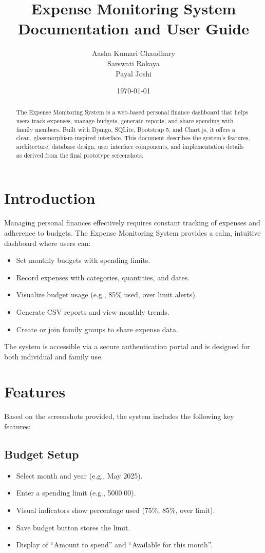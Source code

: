 \documentclass[12pt,a4paper]{article}
\title{\textbf{Expense Monitoring System} \\ \Large Documentation and User Guide}
\author{Aasha Kumari Chaudhary \\ Sarswati Rokaya \\ Payal Joshi}
\date{\today}
\begin{document}
\maketitle

\begin{abstract}
The Expense Monitoring System is a web-based personal finance dashboard that helps users track expenses, manage budgets, generate reports, and share spending with family members. Built with Django, SQLite, Bootstrap 5, and Chart.js, it offers a clean, glassmorphism-inspired interface. This document describes the system's features, architecture, database design, user interface components, and implementation details as derived from the final prototype screenshots.
\end{abstract}

\newpage
\tableofcontents
\newpage

\section{Introduction}
Managing personal finances effectively requires constant tracking of expenses and adherence to budgets. The Expense Monitoring System provides a calm, intuitive dashboard where users can:
\begin{itemize}
    \item Set monthly budgets with spending limits.
    \item Record expenses with categories, quantities, and dates.
    \item Visualize budget usage (e.g., 85\% used, over limit alerts).
    \item Generate CSV reports and view monthly trends.
    \item Create or join family groups to share expense data.
\end{itemize}
The system is accessible via a secure authentication portal and is designed for both individual and family use.

\section{Features}
Based on the screenshots provided, the system includes the following key features:

\subsection{Budget Setup}
\begin{itemize}
    \item Select month and year (e.g., May 2025).
    \item Enter a spending limit (e.g., 5000.00).
    \item Visual indicators show percentage used (75\%, 85\%, over limit).
    \item Save budget button stores the limit.
    \item Display of “Amount to spend” and “Available for this month”.
\end{itemize}
\end{document}
